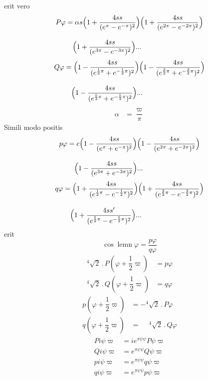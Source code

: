 \noindent erit vero
\[
\begin{aligned}P\varphi &=\alpha s
 \Bigl(1+\dfrac{4ss}{(e^{\pi}-e^{-\pi})^{2}}\Bigr)
 \Bigl(1+\dfrac{4ss}{(e^{2\pi}-e^{-2\pi})^{2}}\Bigr)
 \\[9pt]&\quad{}\Bigl(1+\dfrac{4ss}{(e^{3\pi}-e^{-3\pi})^{2}}\Bigr)\mathord{.}\mathord{.}\mathord{.}\end{aligned}
\]
\[
\begin{aligned}Q\varphi &=
 \Bigl(1-\dfrac{4ss}{(e^{\frac12\pi}+e^{-\frac12\pi})^{2}}\Bigr)
 \Bigl(1-\dfrac{4ss}{(e^{\frac32\pi}+e^{-\frac32\pi})^{2}}\Bigr)
 \\[9pt]&\quad{}\Bigl(1-\dfrac{4ss}{(e^{\frac52\pi}+e^{-\frac52\pi})^{2}}\Bigr)\mathord{.}\mathord{.}\mathord{.}\end{aligned}
\]
\[
\begin{aligned}\alpha &=\dfrac{\varpi}{\pi}\end{aligned}
\]
Simili modo positis
\[
\begin{aligned}p\varphi &=c
 \Bigl(1-\dfrac{4ss}{(e^{\pi}+e^{-\pi})^{2}}\Bigr)
 \Bigl(1-\dfrac{4ss}{(e^{2\pi}+e^{-2\pi})^{2}}\Bigr)
 \\[9pt]&\quad{}\Bigl(1-\dfrac{4ss}{(e^{3\pi}+e^{-3\pi})^{2}}\Bigr)\mathord{.}\mathord{.}\mathord{.}\end{aligned}
\]
\[
\begin{aligned}q\varphi &=
 \Bigl(1+\dfrac{4ss}{(e^{\frac12\pi}-e^{-\frac12\pi})^{2}}\Bigr)
 \Bigl(1+\dfrac{4ss}{(e^{\frac32\pi}-e^{-\frac32\pi})^{2}}\Bigr)
 \\[9pt]&\quad{}\Bigl(1+\dfrac{4ss'}{(e^{\frac52\pi}-e^{-\frac52\pi})^{2}}\Bigr)\mathord{.}\mathord{.}\mathord{.}\end{aligned}
\]
\noindent erit
\[
\cos\operatorname{lemn}\varphi=\dfrac{p\varphi}{q\varphi}
\]
\[
\begin{aligned}
{}^{4}\!\surd 2\, .\,P(\varphi+\dfrac12\varpi)&=p\varphi\\[5pt]
{}^{4}\!\surd 2\, .\,Q(\varphi+\dfrac12\varpi)&=q\varphi
\end{aligned}
\]
\[
\begin{aligned}
p(\varphi+\dfrac12\varpi)&=-{}^{4}\!\surd 2\, .\,P\varphi\\[5pt]
q(\varphi+\dfrac12\varpi)&=\phantom{-}{}^{4}\!\surd 2\, .\,Q\varphi
\end{aligned}
\]
\[
\begin{aligned}
Pi\psi\varpi&=ie^{\pi\psi\psi}P\psi\varpi\\[5pt]
Qi\psi\varpi&=e^{\pi\psi\psi}Q\psi\varpi\\[5pt]
pi\psi\varpi&=e^{\pi\psi\psi}q\psi\varpi\\[5pt]
qi\psi\varpi&=e^{\pi\psi\psi}p\psi\varpi
\end{aligned}
\]
